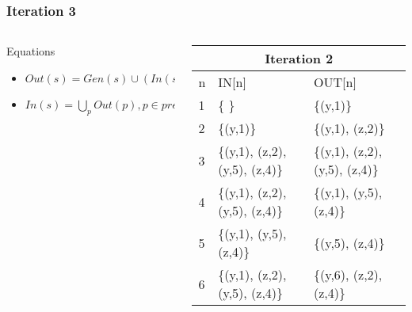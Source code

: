 \begin{frame}[fragile, t]
	\frametitle{Iteration 3} 
	
	\vspace{-1cm}
	
	\begin{columns}[T]
		\begin{column}[T]{.4\textwidth}
			\begin{center}
				\begin{tiny}
					\begin{minipage}{8cm}
						\begin{block}{Equations}
							\begin{itemize}
								\item $Out(s) = Gen(s) \cup (In(s) - Kill(s))$  
								\item $In(s) = \bigcup_p Out(p), p \in pred(s), s \in stmts$
							\end{itemize}
						\end{block}
					\end{minipage}
				\end{tiny}
			\end{center}
		\end{column}
		\begin{column}[T]{.6\textwidth}
			\begin{tiny}
				\begin{table}[]
					\begin{tabular}{|l|l|l|}
						\hline			
						\multicolumn{3}{|c|}{Iteration 2}\\
						\hline
						n  & IN{[}n{]} & OUT{[}n{]} \\ \hline
						1  & \{ \}                          & \{(y,1)\} \\ \hline
						2  & \{(y,1)\}                      & \{(y,1), (z,2)\} \\ \hline
						3  & \{(y,1), (z,2), (y,5), (z,4)\} & \{(y,1), (z,2), (y,5), (z,4)\} \\ \hline
						4  & \{(y,1), (z,2), (y,5), (z,4)\} & \{(y,1), (y,5), (z,4)\} \\ \hline
						5  & \{(y,1), (y,5), (z,4)\}        & \{(y,5), (z,4)\} \\ \hline
						6  & \{(y,1), (z,2), (y,5), (z,4)\} & \{(y,6), (z,2), (z,4)\} \\ \hline
					\end{tabular}
				\end{table}   
			\end{tiny}
		\end{column}
	\end{columns}
	

\end{frame}
